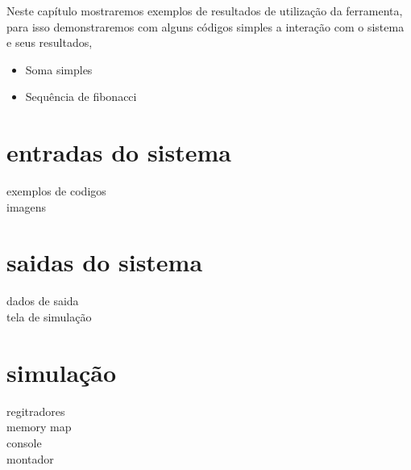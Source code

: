 Neste capítulo mostraremos exemplos de resultados de utilização da ferramenta, para isso demonstraremos com alguns códigos simples a interação com o sistema e seus resultados,

\begin{itemize}
	\item Soma simples
	\item Sequência de fibonacci
\end{itemize}

\section{entradas do sistema}
	exemplos de codigos\\
	imagens\\

\section{saidas do sistema}
	dados de saida\\
	tela de simulação

\section{simulação}
	regitradores\\
	memory map\\
	console\\
	montador\\

